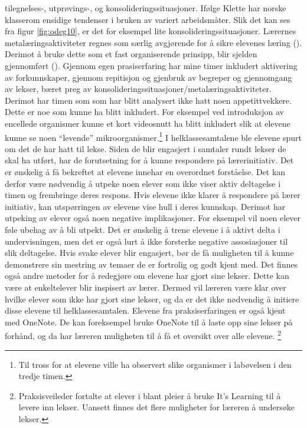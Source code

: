 \documentclass[main.tex]{subfiles}
\begin{document}
tilegnelses-, utprøvings-, og konsolideringssituasjoner. Ifølge Klette har norske klasserom ensidige 
tendenser i bruken av variert arbeidsmåter. Slik det kan ses fra figur \ref{fig:odeg10}, er det for 
eksempel lite konsolideringssituasjoner. Lærernes metalæringsaktiviteter regnes som særlig 
avgjørende for å sikre elevenes læring (). Derimot å bruke dette som et fast
organiserende prinsipp, blir sjelden gjennomført (). Gjennom egen prasiserfaring
har mine timer inkludert aktivering av forkunnskaper, gjennom repitisjon og gjenbruk av begreper 
og gjennomgang av lekser, bæret preg av konsolideringssituasjoner/metalæringsaktiviteter. Derimot
har timen som som har blitt analysert ikke hatt noen appetittvekkere. Dette er noe som kunne ha blitt 
inkludert. For eksempel ved introduksjon av encellede organismer kunne et kort videosnutt ha blitt
inkludert slik at elevene kunne se noen ``levende'' mikroorganismer.\footnote[3]{Til tross for at 
elevene ville ha observert slike organismer i labøvelsen i den tredje timen.}  
\newline
\newline
I helklassesamtalene ble elevene spurt om det de har hatt til lekse.
Siden de blir engasjert i samtaler rundt lekser de skal ha utført, har de forutsetning for å kunne 
respondere på lærerinitiativ. Det er ønskelig å få bekreftet at elevene innehar en overordnet 
forståelse. Det kan derfor være nødvendig å utpeke noen elever som ikke viser aktiv deltagelse i 
timen og frembringe deres respons. Hvis elevene ikke klarer å respondere på lærer initiativ, kan 
utspørringen av elevene vise hull i deres kunnskap. Derimot har utpeking av elever også noen 
negative implikasjoner. For eksempel vil noen elever føle ubehag av å bli utpekt. Det er ønskelig å 
trene elevene i å aktivt delta i undervisningen, men det er også lurt å ikke forsterke negative 
assosiasjoner til slik deltagelse. Hvis svake elever blir engasjert, bør de få muligheten til å 
kunne demonstrere sin mestring av temaer de er fortrolig og godt kjent med. Det finnes også andre 
metoder for å redegjøre om elevene har gjort sine lekser. Dette kan være at enkeltelever blir 
inspisert av lærer. Dermed vil læreren være klar over hvilke elever som ikke har gjort sine lekser, 
og da er det ikke nødvendig å initiere disse elevene til helklassesamtalen. Elevene fra 
praksiserfaringen er også kjent med OneNote. De kan foreksempel bruke OneNote til å laste opp 
sine lekser på forhånd, og da har læreren muligheten til å få et oversikt over alle elevene.
\footnote[4]{Praksisveileder fortalte at elever i blant pleier å bruke It's Learning til å levere
inn lekser. Uansett finnes det flere muligheter for læreren å undersøke lekser.}
\end{document}
